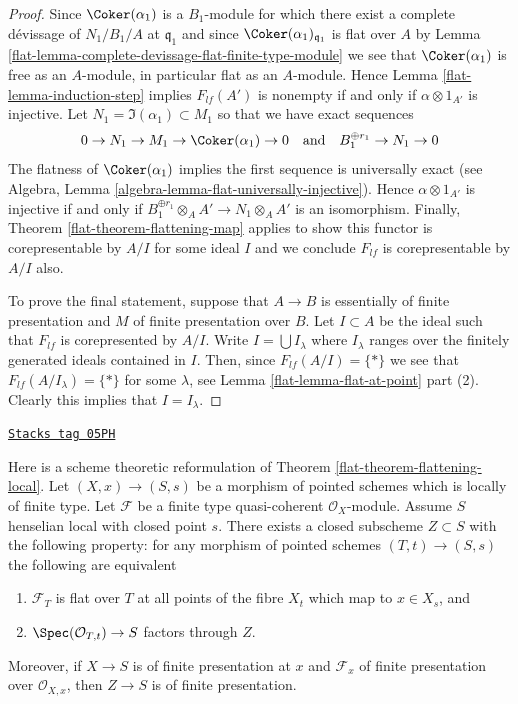 \begin{proof}
\medskip\noindent
Since $\Coker(\alpha_1)$ is a $B_1$-module for which
there exist a complete d\'evissage of $N_1/B_1/A$ at $\mathfrak q_1$
and since $\Coker(\alpha_1)_{\mathfrak q_1}$ is
flat over $A$ by
Lemma \ref{flat-lemma-complete-devissage-flat-finite-type-module}
we see that $\Coker(\alpha_1)$ is free as an $A$-module, in particular
flat as an $A$-module. Hence
Lemma \ref{flat-lemma-induction-step}
implies $F_{lf}(A')$ is nonempty if and only if $\alpha \otimes 1_{A'}$
is injective. Let $N_1 = \Im(\alpha_1) \subset M_1$ so that
we have exact sequences
$$
0 \to N_1 \to M_1 \to \Coker(\alpha_1) \to 0
\quad\text{and}\quad
B_1^{\oplus r_1} \to N_1 \to 0
$$
The flatness of $\Coker(\alpha_1)$ implies the first sequence
is universally exact (see
Algebra, Lemma \ref{algebra-lemma-flat-universally-injective}).
Hence $\alpha \otimes 1_{A'}$ is injective if and only if
$B_1^{\oplus r_1} \otimes_A A' \to N_1 \otimes_A A'$
is an isomorphism. Finally,
Theorem \ref{flat-theorem-flattening-map}
applies to show this functor is corepresentable by $A/I$ for some ideal $I$
and we conclude $F_{lf}$ is corepresentable by $A/I$ also.

\medskip\noindent
To prove the final statement, suppose that $A \to B$ is essentially of finite
presentation and $M$ of finite presentation over $B$. Let $I \subset A$
be the ideal such that $F_{lf}$ is corepresented by $A/I$.
Write $I = \bigcup I_\lambda$ where $I_\lambda$ ranges over the finitely
generated ideals contained in $I$. Then, since $F_{lf}(A/I) = \{*\}$
we see that $F_{lf}(A/I_\lambda) = \{*\}$ for some $\lambda$, see
Lemma \ref{flat-lemma-flat-at-point} part (2).
Clearly this implies that $I = I_\lambda$.
\end{proof}

\begin{remark}
\label{flat-remark-flattening-local-scheme-theoretic}
\href{https://stacks.math.columbia.edu/tag/05PH}{\texttt{Stacks tag 05PH}}

Here is a scheme theoretic reformulation of
Theorem \ref{flat-theorem-flattening-local}.
Let $(X, x) \to (S, s)$ be a morphism of pointed schemes
which is locally of finite type. Let $\mathcal{F}$ be a finite
type quasi-coherent $\mathcal{O}_X$-module.
Assume $S$ henselian local with closed point $s$.
There exists a closed subscheme $Z \subset S$ with the following property:
for any morphism of pointed schemes $(T, t) \to (S, s)$ the following
are equivalent
\begin{enumerate}
\item $\mathcal{F}_T$ is flat over $T$ at all points of the fibre
$X_t$ which map to $x \in X_s$, and
\item $\Spec(\mathcal{O}_{T, t}) \to S$ factors through $Z$.
\end{enumerate}
Moreover, if $X \to S$ is of finite presentation at $x$ and $\mathcal{F}_x$
of finite presentation over $\mathcal{O}_{X, x}$, then $Z \to S$
is of finite presentation.
\end{remark}

